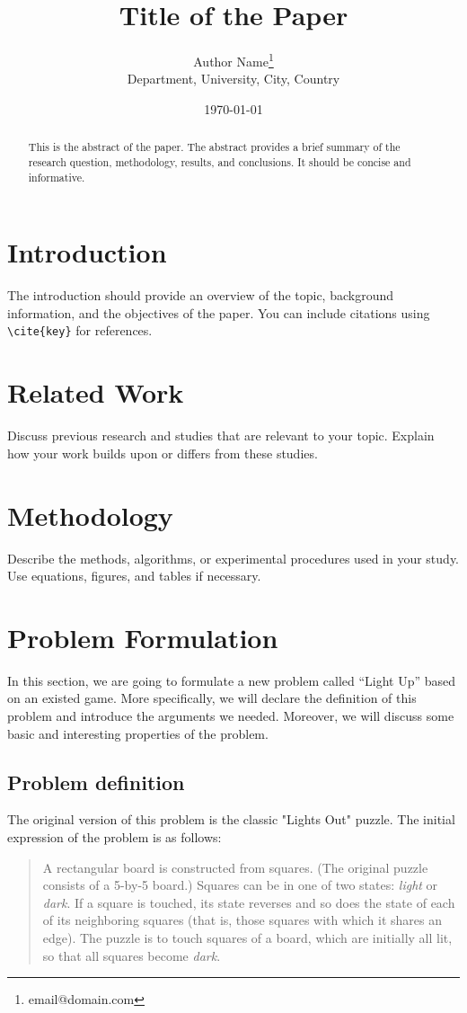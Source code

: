 \documentclass[11pt]{article}
\title{Title of the Paper}
\author{Author Name\thanks{email@domain.com} \\ Department, University, City, Country}
\date{\today}
\begin{document}
\maketitle

\begin{abstract}
This is the abstract of the paper. The abstract provides a brief summary of the research question, methodology, results, and conclusions. It should be concise and informative.\cite{kirkpatrick1983optimization}
\end{abstract}

\section{Introduction}
The introduction should provide an overview of the topic, background information, and the objectives of the paper. You can include citations using \texttt{\textbackslash cite\{key\}} for references.

\section{Related Work}
Discuss previous research and studies that are relevant to your topic. Explain how your work builds upon or differs from these studies.

\section{Methodology}
Describe the methods, algorithms, or experimental procedures used in your study. Use equations, figures, and tables if necessary.

\section{Problem Formulation}
In this section, we are going to formulate a new problem called ``Light Up'' based on an existed game. More specifically, we will declare the definition of this problem and introduce the arguments we needed. Moreover, we will discuss some basic and interesting properties of the problem.

\subsection{Problem definition}
The original version of this problem is the classic "Lights Out" puzzle\cite{cowen2000lights}. The initial expression of the problem is as follows:
\begin{quote}
    A rectangular board is constructed from squares. (The original puzzle consists of a 5-by-5 board.) Squares can be in one of two states:
    \textit{light} or \textit{dark}. If a square is touched, its state reverses and so does the state of each of its neighboring squares (that is, those squares with which it shares an edge). The puzzle is to touch squares of a board, which are initially all lit, so that all squares become \textit{dark}.
\end{quote}
\end{document}

